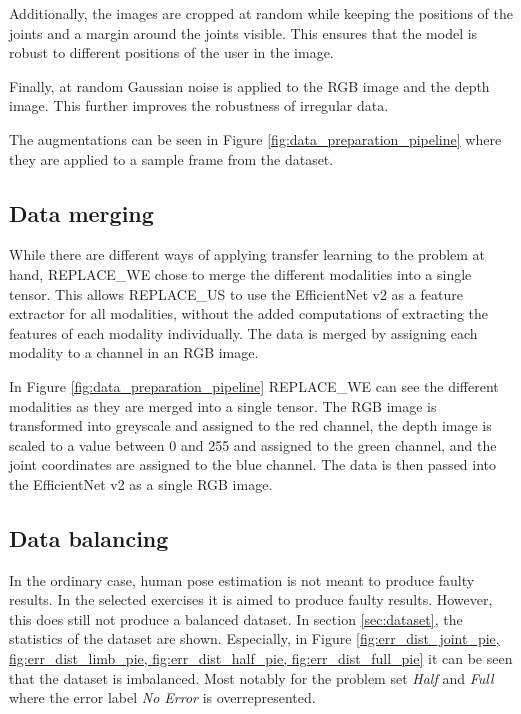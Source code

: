 Additionally, the images are cropped at random while keeping the positions of the joints and a margin around the joints visible. This ensures that the model is robust to different positions of the user in the image. 

Finally, at random Gaussian noise is applied to the RGB image and the depth image. This further improves the robustness of irregular data.

The augmentations can be seen in Figure \ref{fig:data_preparation_pipeline} where they are applied to a sample frame from the dataset.

\subsection{Data merging}

While there are different ways of applying transfer learning to the problem at hand, REPLACE_WE chose to merge the different modalities into a single tensor. This allows REPLACE_US to use the EfficientNet v2 as a feature extractor for all modalities, without the added computations of extracting the features of each modality individually. The data is merged by assigning each modality to a channel in an RGB image.

In Figure \ref{fig:data_preparation_pipeline} REPLACE_WE can see the different modalities as they are merged into a single tensor. The RGB image is transformed into greyscale and assigned to the red channel, the depth image is scaled to a value between 0 and 255 and assigned to the green channel, and the joint coordinates are assigned to the blue channel. The data is then passed into the EfficientNet v2 as a single RGB image.

\subsection{Data balancing}

In the ordinary case, human pose estimation is not meant to produce faulty results. In the selected exercises it is aimed to produce faulty results. However, this does still not produce a balanced dataset. In section \ref{sec:dataset}, the statistics of the dataset are shown. Especially, in Figure \ref{fig:err_dist_joint_pie, fig:err_dist_limb_pie, fig:err_dist_half_pie, fig:err_dist_full_pie} it can be seen that the dataset is imbalanced. Most notably for the problem set \textit{Half} and \textit{Full} where the error label \textit{No Error} is overrepresented.

